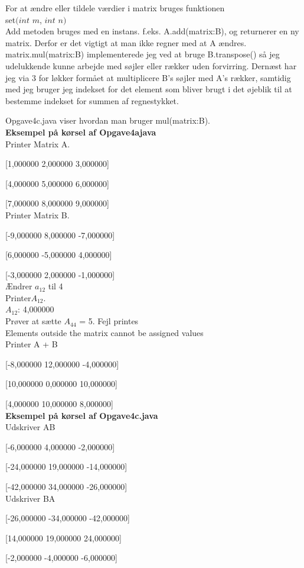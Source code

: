 \documentclass[12pt]{article}
\begin{document}
{For at ændre eller tildele værdier i matrix bruges funktionen\\ set$(int$ $m$, $int $ $n$$)$\\

Add metoden bruges med en instans. f.eks. A.add(matrix:B), og returnerer en ny matrix. Derfor er det vigtigt at man ikke regner med at A ændres.\\


matrix.mul(matrix:B) implementerede jeg ved at bruge B.transpose()  så jeg udelukkende kunne 
arbejde med søjler eller rækker uden forvirring. Dernæst har jeg via 3 for løkker formået at multiplicere B's søjler med A's rækker, samtidig med jeg bruger jeg indekset for det element som bliver brugt i det øjeblik til at bestemme indekset for summen af regnestykket.

Opgave4c.java viser hvordan man bruger mul(matrix:B).\\

\textbf{Eksempel på kørsel af Opgave4ajava}\\

Printer Matrix A.

[1,000000 2,000000 3,000000]

[4,000000 5,000000 6,000000]

[7,000000 8,000000 9,000000]\\

Printer Matrix B.

[-9,000000 8,000000 -7,000000]

[6,000000 -5,000000 4,000000]

[-3,000000 2,000000 -1,000000]\\

Ændrer $a_{12} $ til 4\\

Printer$ A_{12}.$\\

$A_{12}$: 4,000000\\

Prøver at sætte $A_{44}$ = 5. Fejl printes\\

Elements outside the matrix cannot be assigned values\\

Printer A + B

[-8,000000 12,000000 -4,000000]

[10,000000 0,000000 10,000000]

[4,000000 10,000000 8,000000]\\

\textbf{Eksempel på kørsel af Opgave4c.java}\\

Udskriver AB

[-6,000000 4,000000 -2,000000]

[-24,000000 19,000000 -14,000000]

[-42,000000 34,000000 -26,000000]\\

Udskriver BA

[-26,000000 -34,000000 -42,000000]

[14,000000 19,000000 24,000000]

[-2,000000 -4,000000 -6,000000]


}
\end{document}
